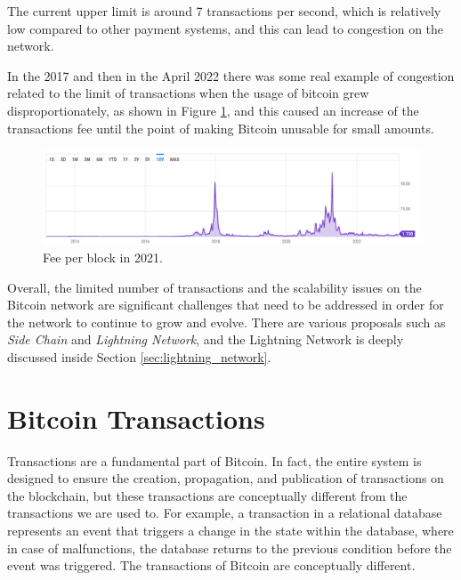 The current upper limit is around 7 transactions per second, 
which is relatively low compared to other payment systems, and 
this can lead to congestion on the network.

In the 2017 and then in the April 2022 there was some real example of congestion 
related to the limit of transactions when the usage of bitcoin\noteOnBitcoinNaming
grew disproportionately, as shown in Figure \ref{fig:fee_x_block}, and this
caused an increase of the transactions fee until the point of making
Bitcoin unusable for  small amounts.

\begin{figure}
    \begin{center}
      \includegraphics[scale=0.3]{imgs/feerate_blocks.png}
    \end{center}
    \caption{Fee per block in 2021.}
    \label{fig:fee_x_block}
\end{figure}


Overall, the limited number of transactions and the scalability issues on the Bitcoin network
are significant challenges that need to be addressed in order for the network to continue
to grow and evolve. There are various proposals such as \emph{Side Chain} and \emph{Lightning Network}, 
and the Lightning Network is deeply discussed inside Section \ref{sec:lightning_network}.


\section{Bitcoin Transactions}

Transactions are a fundamental part of Bitcoin. In fact, the entire system is designed to ensure
the creation, propagation, and publication of transactions on the blockchain, but these
transactions are conceptually different from the transactions we are used to.
For example, a transaction in a relational database represents an event that triggers a
change in the state within the database, where in case of malfunctions, the database returns
to the previous condition before the event was triggered.
The transactions of Bitcoin are conceptually different.

